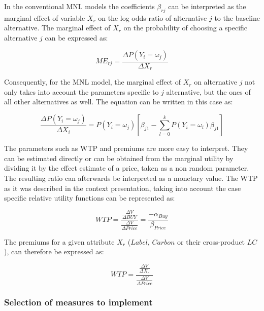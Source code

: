 \documentclass[12pt,]{article}
\begin{document}
In the conventional MNL models the coefficients \(\beta_{rj}\) can be
interpreted as the marginal effect of variable \(X_r\) on the log
odds-ratio of alternative \(j\) to the baseline alternative. The
marginal effect of \(X_r\) on the probability of choosing a specific
alternative \(j\) can be expressed as:

\begin{equation}
ME_{rj} = \frac{
    \Delta P(Y_i = \omega_j) 
}{
    \Delta X_r 
}
\end{equation}

Consequently, for the MNL model, the marginal effect of \(X_r\) on
alternative \(j\) not only takes into account the parameters specific to
\(j\) alternative, but the ones of all other alternatives as well. The
equation can be written in this case as:

\begin{equation}
\frac{
    \Delta P(Y_i = \omega_j) 
}{
    \Delta X_i 
} = P(Y_i = \omega_j) [
    \beta_{j1} - \sum_{l = 0}^k P(Y_i = \omega_l) \beta_{j1}
]
\end{equation}

The parameters such as WTP and premiums are more easy to interpret. They
can be estimated directly or can be obtained from the marginal utility
by dividing it by the effect estimate of a price, taken as a non random
parameter. The resulting ratio can afterwards be interpreted as a
monetary value. The WTP as it was described in the context presentation,
taking into account the case specific relative utility functions can be
represented as:

\begin{equation}
WTP = \frac{
  \frac{\Delta V}{\Delta BUY}
}{
  \frac{\Delta V}{\Delta Price}
} = \frac{
  - \alpha_{Buy}
}{
  \beta_{Price}
}
\end{equation}

The premiums for a given attribute \(X_r\) (\(Label\), \(Carbon\) or
their cross-product \(LC\)), can therefore be expressed as:

\begin{equation}
WTP = \frac{
  \frac{\Delta V}{\Delta X_r}
}{
   \frac{\Delta V}{\Delta Price}
}
\end{equation}

\hypertarget{selection-of-measures-to-implement}{%
\subsubsection{Selection of measures to
implement}\label{selection-of-measures-to-implement}}
\end{document}
